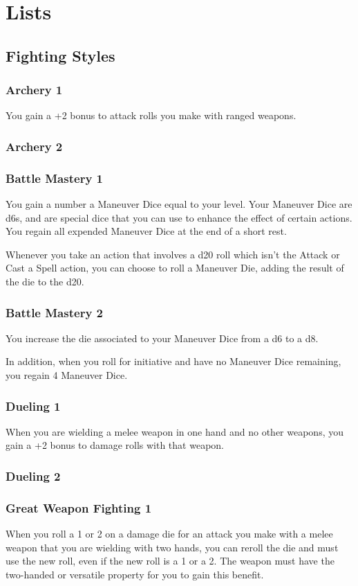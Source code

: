 \section{Lists} %
\subsection*{Fighting Styles} \label{ssec::fightingstyles}
\subsubsection{Archery 1}
    You gain a +2 bonus to attack rolls you make with ranged weapons.
\subsubsection{Archery 2}
\subsubsection{Battle Mastery 1}
    You gain a number a Maneuver Dice equal to your level.
    Your Maneuver Dice are d6s, and are special dice that you can use to enhance the effect of certain actions.
    You regain all expended Maneuver Dice at the end of a short rest.

    Whenever you take an action that involves a d20 roll which isn't the Attack or Cast a Spell action, you can choose to roll a Maneuver Die, adding the result of the die to the d20.
\subsubsection{Battle Mastery 2}
    You increase the die associated to your Maneuver Dice from a d6 to a d8.

    In addition, when you roll for initiative and have no Maneuver Dice remaining, you regain 4 Maneuver Dice.
\subsubsection{Dueling 1}
    When you are wielding a melee weapon in one hand and no other weapons, you gain a +2 bonus to damage rolls with that weapon.
\subsubsection{Dueling 2}
\subsubsection{Great Weapon Fighting 1}
    When you roll a 1 or 2 on a damage die for an attack you make with a melee weapon that you are wielding with two hands, you can reroll the die and must use the new roll, even if the new roll is a 1 or a 2.
    The weapon must have the two-handed or versatile property for you to gain this benefit.
